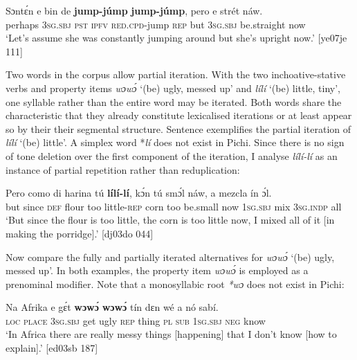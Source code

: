 \ea%
    \label{ex:key:158}
    \gll Sɔntɛ́n  e    bin  de  \textbf{jump-júmp}    \textbf{jump-júmp},
pero  e    strét    náw.\\
perhaps  \textsc{3sg.sbj}  \textsc{pst}  \textsc{ipfv}  \textsc{red.cpd}{}-jump    \textsc{rep}
but    \textsc{3sg.sbj}  be.straight  now\\

\glt ‘Let’s assume she was constantly jumping around but she’s upright now.’ [ye07je 111]
\z

Two words in the corpus allow partial iteration. With the two inchoative-stative verbs and property items \textit{wɔwɔ́} ‘(be) ugly, messed up’ and \textit{lílí} ‘(be) little, tiny’, one syllable rather than the entire word may be iterated. Both words share the characteristic that they already constitute lexicalised iterations or at least appear so by their their segmental structure. Sentence  exemplifies the partial iteration of \textit{lílí} ‘(be) little’. A simplex word *\textit{lí} does not exist in Pichi. Since there is no sign of tone deletion over the first component of the iteration, I analyse \textit{lílí-lí} as an instance of partial repetition rather than reduplication: 


\ea%
    \label{ex:key:159}
    \gll Pero    como  di  harina  tú  \textbf{lílí-lí},  kɔ́n    tú  smɔ́l  náw,
a    mezcla  ín    ɔ́l.\\
but    since  \textsc{def}  flour  too  little-\textsc{rep}  corn    too  be.small  now  
\textsc{1sg.sbj}  mix    \textsc{3sg.indp}  all\\

\glt ‘But since the flour is too little, the corn is too little now, I mixed all of it [in making the porridge].’ [dj03do 044]
\z


Now compare the fully  and partially iterated  alternatives for \textit{wɔwɔ́} ‘(be) ugly, messed up’. In both examples, the property item \textit{wɔwɔ́} is employed as a prenominal modifier. Note that a monosyllabic root \textit{*wɔ} does not exist in Pichi:


\ea%
    \label{ex:key:160}
    \gll Na  Afrika  e    gɛ́t  \textbf{wɔwɔ́}  \textbf{wɔwɔ́}  tín    dɛn 
wé  a    nó  sabí.\\
\textsc{loc}  \textsc{place}  \textsc{3sg.sbj}  get  ugly    \textsc{rep}    thing  \textsc{pl}  
\textsc{sub}  \textsc{1sg.sbj}  \textsc{neg}  know\\

\glt ‘In Africa there are really messy things [happening] that I don’t know [how to explain].’ [ed03sb 187]

